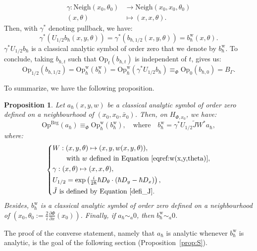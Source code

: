 \documentclass{article}
\newtheorem{prop}[theo]{Proposition}
\newcommand{\Vois}{\mathrm{Neigh}}
\newcommand{\Op}{\mathrm{Op}}
\newcommand{\Brg}{\mathrm{Brg}}
\newcommand{\w}{\mathrm{w}}
\newcommand{\h}{\hbar}
\newcommand{\hnegl}{\equiv_\Phi}
\begin{document}
\begin{align}
  \label{equ:defi-gamma}
  \gamma : \Vois \left( x_0, \theta_0 \right) 
  & \longrightarrow \Vois \left(x_0, x_0, \theta_0  \right) \\
  (x, \theta) & \longmapsto (x, x, \theta).
\end{align}
Then, with $\gamma^*$ denoting pullback, we have:
\[
\gamma^* \left( U_{1/2} b_{ \hbar}(x, y, \theta) \right) = \gamma^*
\left( b_{ \hbar, 1/2} \left( x,y, \theta \right) \right) = b^{\w}_{
  \hbar} \left( x, \theta \right) .
\]
$ \gamma^* U_{1/2} b_{ \hbar}$ is a classical analytic symbol of order
zero that we denote by $b^{\w}_{ \hbar}$. To conclude, taking
$b_{ \hbar, t}$ such that $ \Op_t (b_{ \hbar, t})$ is independent of
$t$, gives us:
\[
\Op_{1/2}(b_{ \hbar, 1/2}) = \Op^{\w}_\h(b_{ \hbar}^{\w}) =
\Op^{\w}_\h(\gamma^* U_{1/2} b_{ \hbar}) \hnegl \Op_0(b_{ \hbar, 0}) =
B_{ \Gamma} .
\]

To summarize, we have the following proposition.

\begin{prop} \label{prop_lien_op_brg_op_weyl} Let
  $a_{ \hbar}(x, y, w)$ be a classical analytic symbol of order zero
  defined on a neighbourhood of $(x_0, x_0, \bar{x}_0)$. Then, on
  $H_{\Phi, x_0}$, we have:
  \[
  \Op^{\Brg}(a_{ \hbar}) \hnegl \Op^{\w}_\h(b^{\w}_{ \hbar}), \quad
  \text{where} \quad b^{\w}_{ \hbar} = \gamma^* U_{1/2} \tilde{J} W^*
  a_{ \hbar},
  \]
  where:
  \[
  \left\lbrace
    \begin{split}
      & W: (x, y, \theta) \mapsto (x, y, w(x, y, \theta)), \\
      & \qquad \text{with $w$ defined in
        Equation~\eqref{eqref:w(x,y,theta)}},\\
      & \gamma: (x, \theta) \mapsto (x, x, \theta), \\
      & U_{1/2} = \exp \left( \tfrac{i}{2 \hbar} \hbar D_{ \theta} \cdot  \left( \hbar D_y - \hbar D_x \right) \right), \\
      & \text{$\tilde{J}$ is defined by Equation \eqref{defi_J}.}
    \end{split}
  \right.
  \]
  Besides, $b^{\w}_{ \hbar}$ is a classical analytic symbol of order
  zero defined on a neighbourhood of
  $\left( x_0, \theta_0 := \frac{2}{i} \frac{\partial \Phi}{\partial
      x} (x_0) \right)$.
  Finally, if $a_\h\sim_a 0$, then $b^{\w}_{ \hbar}\sim_a 0$.
\end{prop}

The proof of the converse statement, namely that $a_\h$ is analytic
whenever $b^{\w}_\h$ is analytic, is the goal of the following section
(Proposition~\ref{prop:S}).
\end{document}

